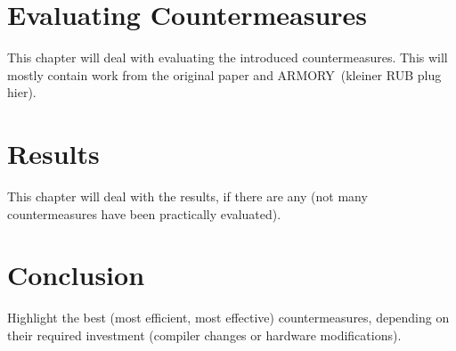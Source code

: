 \chapter{Evaluating Countermeasures}
This chapter will deal with evaluating the introduced countermeasures. This will mostly contain work from the original paper and ARMORY\,\cite{9206547} (kleiner RUB plug hier).


\chapter{Results}
This chapter will deal with the results, if there are any (not many countermeasures have been practically evaluated). 

\chapter{Conclusion}
Highlight the best (most efficient, most effective) countermeasures, depending on their required investment (compiler changes or hardware modifications).
